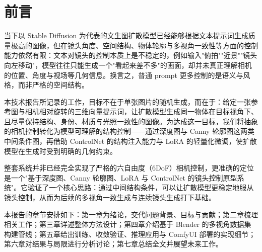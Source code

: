 \chapter*{前言}

当下以 Stable Diffusion 为代表的文生图扩散模型已经能够根据文本提示词生成质量极高的图像，但在镜头角度、空间结构、物体轮廓与多视角一致性等方面的控制能力依然有限：文本对镜头的控制本质上是不稳定的，例如输入"俯拍""近景""镜头向左移动"，模型往往只能生成一个"看起来差不多"的画面，却并未真正理解相机的位置、角度与视场等几何信息。换言之，普通 prompt 更多控制的是语义与风格，而非严格的空间结构。

本技术报告所记录的工作，目标不在于单张图片的随机生成，而在于：给定一张参考图与相机相对旋转的三维向量提示词，让扩散模型生成同一物体在目标视角下、且尽量保持结构、身份、材质与光照一致性的图像。为达成这一目标，我们将抽象的相机控制转化为模型可理解的结构控制——通过深度图与 Canny 轮廓图这两类中间条件图，再借助 ControlNet 的结构注入能力与 LoRA 的轻量化微调，使扩散模型在生成时受到明确的几何约束。

整套系统并非已经完全实现了严格的六自由度（6DoF）相机控制，更准确的定位是一个"基于深度图、Canny 轮廓图、LoRA 与 ControlNet 的镜头控制原型系统"。它验证了一个核心思路：通过中间结构条件，可以让扩散模型更稳定地服从镜头控制，从而为后续的多视角一致生成与连续镜头生成打下基础。

本报告的章节安排如下：第一章为绪论，交代问题背景、目标与贡献；第二章梳理相关工作；第三章详述整体方法设计；第四章介绍基于 Blender 的多视角数据集构建管线；第五章给出训练、收敛验证、推理应用与 ComfyUI 部署的实现细节；第六章对结果与局限进行分析讨论；第七章总结全文并展望未来工作。
